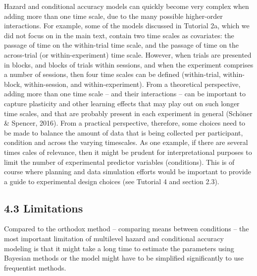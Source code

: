 \documentclass[
  man, donotrepeattitle,floatsintext]{apa6}
\begin{document}
Hazard and conditional accuracy models can quickly become very complex when adding more than one time scale, due to the many possible higher-order interactions.
For example, some of the models discussed in Tutorial 2a, which we did not focus on in the main text, contain two time scales as covariates: the passage of time on the within-trial time scale, and the passage of time on the across-trial (or within-experiment) time scale. However, when trials are presented in blocks, and blocks of trials within sessions, and when the experiment comprises a number of sessions, then four time scales can be defined (within-trial, within-block, within-session, and within-experiment).
From a theoretical perspective, adding more than one time scale -- and their interactions -- can be important to capture plasticity and other learning effects that may play out on such longer time scales, and that are probably present in each experiment in general (Schöner \& Spencer, 2016).
From a practical perspective, therefore, some choices need to be made to balance the amount of data that is being collected per participant, condition and across the varying timescales. As one example, if there are several times cales of relevance, then it might be prudent for interpretational purposes to limit the number of experimental predictor variables (conditions).
This is of course where planning and data simulation efforts would be important to provide a guide to experimental design choices (see Tutorial 4 and section 2.3).

\subsection{4.3 Limitations}\label{limitations}

Compared to the orthodox method -- comparing means between conditions -- the most important limitation of multilevel hazard and conditional accuracy modeling is that it might take a long time to estimate the parameters using Bayesian methods or the model might have to be simplified significantly to use frequentist methods.
\end{document}
